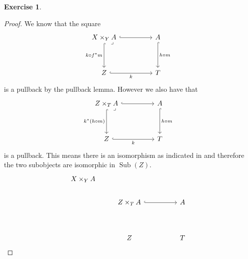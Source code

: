\documentclass{article}
\DeclareMathOperator{\subobj}{Sub}
\theoremstyle{definition}
\newtheorem{question}{Exercise}
\begin{document}
\begin{question}
\begin{enumerate}[a)]
\begin{proof}
                  We know that the square
                  \begin{equation}
                      \begin{tikzcd}[ampersand replacement=\&]
                          {X\times_{Y}A} \&\& A \\
                          \\
                          Z \&\& T
                          \arrow[hook, from=1-1, to=1-3]
                          \arrow["{k\circ f^{*}m}"', hook, from=1-1, to=3-1]
                          \arrow["k"', hook, from=3-1, to=3-3]
                          \arrow["{h\circ m}", hook, from=1-3, to=3-3]
                          \arrow["\lrcorner"{anchor=center, pos=0}, draw=none, from=1-1, to=3-3]
                      \end{tikzcd}
                  \end{equation}
                  is a pullback by the pullback lemma. However we also have that
                  \begin{equation}
                      \begin{tikzcd}[ampersand replacement=\&]
                          {Z\times_{T}A} \&\& A \\
                          \\
                          Z \&\& T
                          \arrow[hook, from=1-1, to=1-3]
                          \arrow["{k^{*}(h\circ m)}"', hook, from=1-1, to=3-1]
                          \arrow["k"', hook, from=3-1, to=3-3]
                          \arrow["{h\circ m}", hook, from=1-3, to=3-3]
                          \arrow["\lrcorner"{anchor=center, pos=0}, draw=none, from=1-1, to=3-3]
                      \end{tikzcd}
                  \end{equation}
                  is a pullback. This means there is an isomorphism as indicated
                  in  and therefore the two subobjects are
                  isomorphic in \(\subobj(Z)\).
                  \begin{equation}
                      \begin{tikzcd}[ampersand replacement=\&]
                          {X\times_{Y}A} \\
                          \& {Z\times_{T}A} \&\& A \\
                          \\
                          \& Z \&\& T
                          \arrow[hook, from=2-2, to=2-4]

\end{tikzcd}
\end{equation}
\end{proof}
\end{enumerate}
\end{question}
\end{document}
